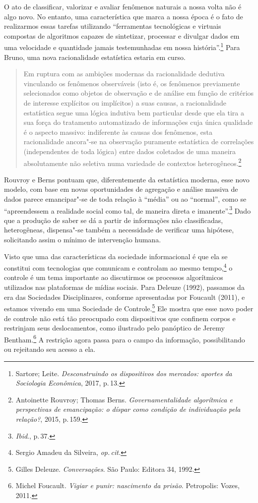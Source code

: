 O ato de classificar, valorizar e avaliar fenômenos naturais a nossa
volta não é algo novo. No entanto, uma característica que marca a nossa
época é o fato de realizarmos essas tarefas utilizando ``ferramentas
tecnológicas e virtuais compostas de algoritmos capazes de sintetizar,
processar e divulgar dados em uma velocidade e quantidade jamais
testemunhadas em nossa história''.\footnote{Sartore; Leite. \emph{Desconstruindo os
dispositivos dos mercados: aportes da Sociologia Econômica}, 2017, p.\,13.} Para Bruno, uma nova racionalidade estatística estaria em curso.

\begin{quote}
Em ruptura com as ambições modernas da racionalidade dedutiva vinculando
os fenômenos observáveis (isto é, os fenômenos previamente selecionados
como objetos de observação e de análise em função de critérios de
interesse explícitos ou implícitos) a suas causas, a racionalidade
estatística segue uma lógica indutiva bem particular desde que ela tira
a sua força do tratamento automatizado de informações cuja única
qualidade é o aspecto massivo: indiferente às causas dos fenômenos, esta
racionalidade ancora"-se na observação puramente estatística de
correlações (independentes de toda lógica) entre dados coletados de uma
maneira absolutamente não seletiva numa variedade de contextos
heterogêneos.\footnote{Antoinette Rouvroy; Thomas Berns. \emph{Governamentalidade
algorítmica e perspectivas de emancipação: o díspar como condição de
individuação pela relação?}, 2015, p.\,159.}
\end{quote}

Rouvroy e Berns pontuam que, diferentemente da estatística
moderna, esse novo modelo, com base em novas oportunidades de agregação
e análise massiva de dados parece emancipar"-se de toda relação à
``média'' ou ao ``normal'', como se ``apreendessem a realidade social
como tal, de maneira direta e imanente''.\footnote{\textit{Ibid}., p.\,37.} Dado que a produção
de saber se dá a partir de informações não classificadas, heterogêneas,
dispensa"-se também a necessidade de verificar uma hipótese, solicitando
assim o mínimo de intervenção humana.

Visto que uma das características da sociedade informacional é que ela
se constitui com tecnologias que comunicam e controlam ao mesmo tempo,\footnote{Sergio Amadeu da Silveira, \textit{op.\,cit.}}
o controle é um tema importante ao discutirmos os
processos algorítmicos utilizados nas plataformas de mídias sociais.
Para Deleuze (1992), passamos da era das Sociedades Disciplinares,
conforme apresentadas por Foucault (2011), e estamos vivendo em uma Sociedade de Controle.\footnote{Gilles Deleuze. \emph{Conversações}. São Paulo: Editora 34, 1992.} Ele mostra que esse novo poder de controle não está tão
preocupado com dispositivos que confinem corpos e restrinjam seus
deslocamentos, como ilustrado pelo panóptico de Jeremy Bentham.\footnote{Michel Foucault. \emph{Vigiar e punir: nascimento da prisão}. Petropolis: Vozes, 2011.}
A restrição agora passa para o campo da informação, possibilitando ou rejeitando seu acesso a ela.

